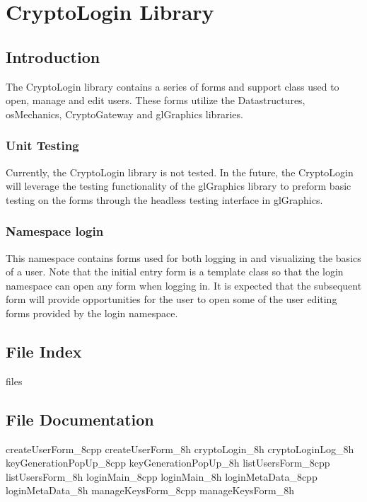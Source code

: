 \part{CryptoLogin Library} \label{sec:cryptologin}

	\chapter{Introduction}

	The CryptoLogin library contains a series of forms and support class used to open, manage and edit users.  These forms utilize the Datastructures, osMechanics, CryptoGateway and glGraphics libraries.

		\section{Unit Testing} \label{sec:unit-testing}
		Currently, the CryptoLogin library is not tested.  In the future, the CryptoLogin will leverage the testing functionality of the glGraphics library to preform basic testing on the forms through the headless testing interface in glGraphics.
		
		\section{Namespace login} \label{sec:Namespace}
		This namespace contains forms used for both logging in and visualizing the basics of a user.  Note that the initial entry form is a template class so that the login namespace can open any form when logging in.  It is expected that the subsequent form will provide opportunities for the user to open some of the user editing forms provided by the login namespace.
		
		\renewcommand{\DOXYGENFOLDER}{../../CryptoLogin/Documentation/doxygenFiles/latex/}

	\chapter{File Index}
		{files}
	
	\chapter{File Documentation}
	
		{createUserForm_8cpp}
		{createUserForm_8h}
		{cryptoLogin_8h}
		{cryptoLoginLog_8h}
		{keyGenerationPopUp_8cpp}
		{keyGenerationPopUp_8h}
		{listUsersForm_8cpp}
		{listUsersForm_8h}
		{loginMain_8cpp}
		{loginMain_8h}
		{loginMetaData_8cpp}
		{loginMetaData_8h}
		{manageKeysForm_8cpp}
		{manageKeysForm_8h}